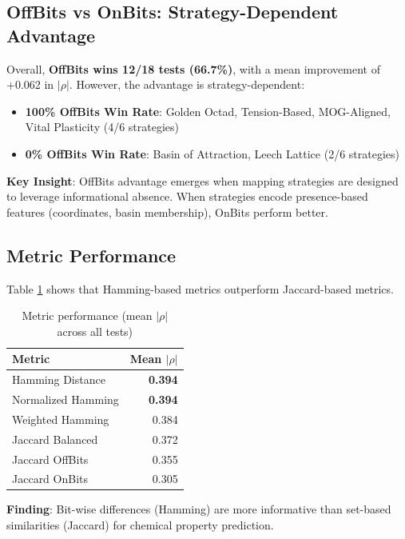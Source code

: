 \documentclass[11pt,letterpaper]{article}
\begin{document}
\subsection{OffBits vs OnBits: Strategy-Dependent Advantage}

Overall, \textbf{OffBits wins 12/18 tests (66.7\%)}, with a mean improvement of +0.062 in $|\rho|$. However, the advantage is strategy-dependent:

\begin{itemize}
    \item \textbf{100\% OffBits Win Rate}: Golden Octad, Tension-Based, MOG-Aligned, Vital Plasticity (4/6 strategies)
    \item \textbf{0\% OffBits Win Rate}: Basin of Attraction, Leech Lattice (2/6 strategies)
\end{itemize}

\textbf{Key Insight}: OffBits advantage emerges when mapping strategies are designed to leverage informational absence. When strategies encode presence-based features (coordinates, basin membership), OnBits perform better.

\subsection{Metric Performance}

Table \ref{tab:metric_perf} shows that Hamming-based metrics outperform Jaccard-based metrics.

\begin{table}[H]
\centering
\caption{Metric performance (mean $|\rho|$ across all tests)}
\label{tab:metric_perf}
\begin{tabular}{lr}
\toprule
\textbf{Metric} & \textbf{Mean $|\rho|$} \\
\midrule
Hamming Distance & \textbf{0.394} \\
Normalized Hamming & \textbf{0.394} \\
Weighted Hamming & 0.384 \\
Jaccard Balanced & 0.372 \\
Jaccard OffBits & 0.355 \\
Jaccard OnBits & 0.305 \\
\bottomrule
\end{tabular}
\end{table}

\textbf{Finding}: Bit-wise differences (Hamming) are more informative than set-based similarities (Jaccard) for chemical property prediction.
\end{document}
